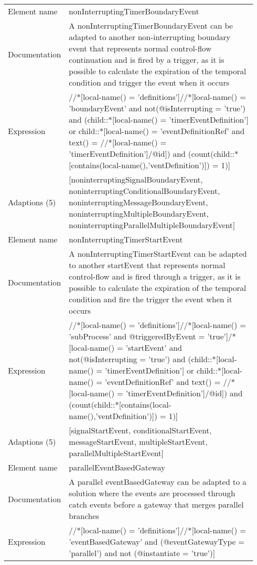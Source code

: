 \begin{center}
\begin{tiny}
\begin{longtable}{p{}|p{}}
\midrule
Element name & nonInterruptingTimerBoundaryEvent\\
\myrowcolour
Documentation &A nonInterruptingTimerBoundaryEvent can be adapted to another non-interrupting boundary event that represents normal control-flow continuation and is fired by a trigger, as it is possible to calculate the expiration of the temporal condition and trigger the event when it occurs\\
Expression & //*[local-name() = 'definitions']//*[local-name() = 'boundaryEvent' and not(@isInterrupting = 'true') and (child::*[local-name() = 'timerEventDefinition'] or child::*[local-name() = 'eventDefinitionRef' and text() = //*[local-name() = 'timerEventDefinition']/@id]) and (count(child::*[contains(local-name(),'ventDefinition')]) = 1)]\\
\myrowcolour
Adaptions (5) & [noninterruptingSignalBoundaryEvent, noninterruptingConditionalBoundaryEvent, noninterruptingMessageBoundaryEvent, noninterruptingMultipleBoundaryEvent, noninterruptingParallelMultipleBoundaryEvent]\\
\midrule
Element name & nonInterruptingTimerStartEvent\\
\myrowcolour
Documentation &A nonInterruptingTimerStartEvent can be adapted to another startEvent that represents normal control-flow and is fired through a trigger, as it is possible to calculate the expiration of the temporal condition and fire the trigger the event when it occurs\\
Expression & //*[local-name() = 'definitions']//*[local-name() = 'subProcess' and @triggeredByEvent = 'true']/*[local-name() = 'startEvent' and not(@isInterrupting = 'true') and (child::*[local-name() = 'timerEventDefinition'] or child::*[local-name() = 'eventDefinitionRef' and text() = //*[local-name() = 'timerEventDefinition']/@id]) and (count(child::*[contains(local-name(),'ventDefinition')]) = 1)]\\
\myrowcolour
Adaptions (5) & [signalStartEvent, conditionalStartEvent, messageStartEvent, multipleStartEvent, parallelMultipleStartEvent]\\
\midrule
Element name & parallelEventBasedGateway\\
\myrowcolour
Documentation &A parallel eventBasedGateway can be adapted to a solution where the events are processed through catch events before a gateway that merges parallel branches\\
Expression & //*[local-name() = 'definitions']//*[local-name() = 'eventBasedGateway' and (@eventGatewayType = 'parallel') and not (@instantiate = 'true')]\\

\end{longtable}
\end{tiny}
\end{center}
